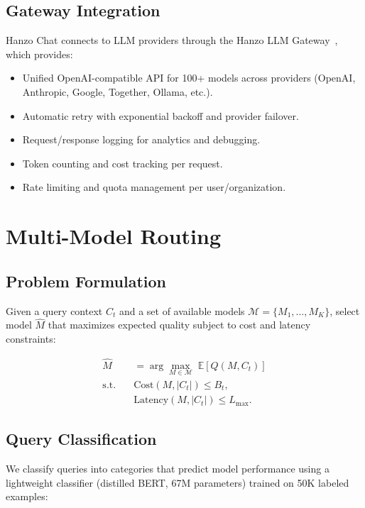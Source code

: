 \documentclass[11pt,twocolumn]{article}
\begin{document}
\subsection{Gateway Integration}

Hanzo Chat connects to LLM providers through the Hanzo LLM Gateway~\cite{hanzollm2025}, which provides:

\begin{itemize}[leftmargin=1.1em]
    \item Unified OpenAI-compatible API for 100+ models across providers (OpenAI, Anthropic, Google, Together, Ollama, etc.).
    \item Automatic retry with exponential backoff and provider failover.
    \item Request/response logging for analytics and debugging.
    \item Token counting and cost tracking per request.
    \item Rate limiting and quota management per user/organization.
\end{itemize}

\section{Multi-Model Routing}
\label{sec:routing}

\subsection{Problem Formulation}

Given a query context $C_t$ and a set of available models $\mathcal{M} = \{M_1, \ldots, M_K\}$, select model $\hat{M}$ that maximizes expected quality subject to cost and latency constraints:

\begin{align}
\hat{M} &= \arg\max_{M \in \mathcal{M}} \; \mathbb{E}[Q(M, C_t)] \label{eq:routing} \\
\text{s.t.} \quad & \text{Cost}(M, |C_t|) \le B_t, \nonumber \\
& \text{Latency}(M, |C_t|) \le L_{\max}. \nonumber
\end{align}

\subsection{Query Classification}

We classify queries into categories that predict model performance using a lightweight classifier (distilled BERT, 67M parameters) trained on 50K labeled examples:
\end{document}
